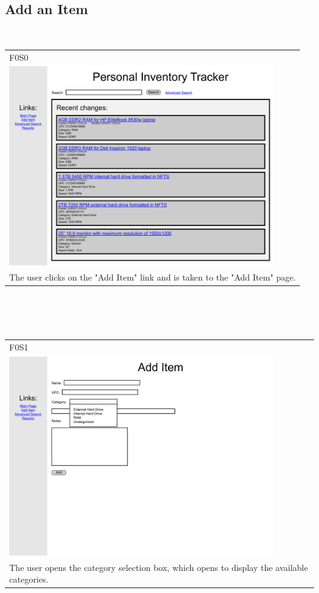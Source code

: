 \documentclass{article}
\begin{document}
\subsection{Add an Item}
\clearpage
~\\
\begin{tabular}{ p{4.5in} }
F0S0\\
\includegraphics[keepaspectratio, width=4.5in]{addItemF0S0.pdf}\\
The user clicks on the "Add Item" link and is taken to the "Add Item" page. 
\end{tabular}\\
~\\
~\\
\begin{tabular}{ p{4.5in} }
F0S1\\
\includegraphics[keepaspectratio, width=4.5in]{addItemF0S1.pdf}\\
The user opens the category selection box, which opens to display the available categories.
\end{tabular}\\
\end{document}
